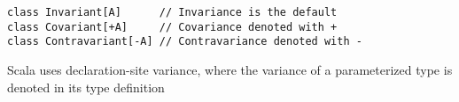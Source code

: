 \begin{algorithm}

\begin{verbatim}
class Invariant[A]      // Invariance is the default
class Covariant[+A]     // Covariance denoted with +
class Contravariant[-A] // Contravariance denoted with -
\end{verbatim}

\caption{Scala uses declaration-site variance, where the variance of a parameterized type is denoted in its type definition  \label{declaration-site-variance}}
\end{algorithm}